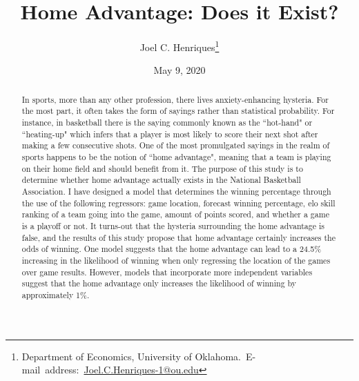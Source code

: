 \documentclass[12pt,english]{article}
\begin{document}
\begin{singlespace}
\title{Home Advantage: Does it Exist?}
\end{singlespace}

\author{Joel C. Henriques\thanks{Department of Economics, University of Oklahoma.\
E-mail~address:~\href{mailto:student.name@ou.edu}{Joel.C.Henriques-1@ou.edu}}}

\date{May 9, 2020}

\maketitle

\begin{abstract}
\begin{singlespace}
In sports, more than any other profession, there lives anxiety-enhancing hysteria. For the most part, it often takes the form of sayings rather than statistical probability. For instance, in basketball there is the saying commonly known as the “hot-hand" or “heating-up" which infers that a player is most likely to score their next shot after making a few consecutive shots. One of the most promulgated sayings in the realm of sports happens to be the notion of “home advantage", meaning that a team is playing on their home field and should benefit from it. The purpose of this study is to determine whether home advantage actually exists in the National Basketball Association. I have designed a model that determines the winning percentage through the use of the following regressors: game location, forecast winning percentage, elo skill ranking of a team going into the game, amount of points scored, and whether a game is a playoff or not. It turns-out that the hysteria surrounding the home advantage is false, and the results of this study propose that home advantage certainly increases the odds of winning. One model suggests that the home advantage can lead to a 24.5\% increasing in the likelihood of winning when only regressing the location of the games over game results. However, models that incorporate more independent variables suggest that the home advantage only increases the likelihood of winning by approximately 1\%. 
\end{singlespace}

\end{abstract}
\vfill{}


\pagebreak{}
\end{document}
